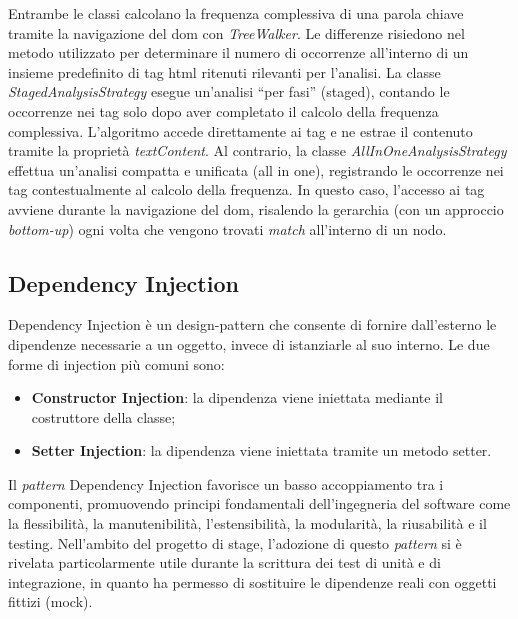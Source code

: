 \vspace{10pt}
\par\noindent Entrambe le classi calcolano la frequenza complessiva di una parola chiave tramite la navigazione del \gls{dom} con \textit{TreeWalker}. Le differenze risiedono nel metodo utilizzato per determinare il numero di occorrenze all’interno di un insieme predefinito di tag \gls{html} ritenuti rilevanti per l’analisi. La classe \textit{StagedAnalysisStrategy} esegue un’analisi “per fasi” (staged), contando le occorrenze nei tag solo dopo aver completato il calcolo della frequenza complessiva. L’algoritmo accede direttamente ai tag e ne estrae il contenuto tramite la proprietà \textit{textContent}. Al contrario, la classe \textit{AllInOneAnalysisStrategy} effettua un’analisi compatta e unificata (all in one), registrando le occorrenze nei tag contestualmente al calcolo della frequenza. In questo caso, l’accesso ai tag avviene durante la navigazione del \gls{dom}, risalendo la gerarchia (con un approccio \textit{bottom-up}) ogni volta che vengono trovati \textit{match} all’interno di un nodo.

\subsection{Dependency Injection}

\par Dependency Injection è un \gls{design-pattern} che consente di fornire dall’esterno le dipendenze necessarie a un oggetto, invece di istanziarle al suo interno. Le due forme di injection più comuni sono:
\begin{itemize}
  \item \textbf{Constructor Injection}: la dipendenza viene iniettata mediante il costruttore della classe;
  \item \textbf{Setter Injection}: la dipendenza viene iniettata tramite un metodo setter.
\end{itemize}

\vspace{5pt}
\par\noindent Il \textit{pattern} Dependency Injection favorisce un basso accoppiamento tra i componenti, promuovendo principi fondamentali dell’ingegneria del software come la flessibilità, la manutenibilità, l’estensibilità, la modularità, la riusabilità e il testing. Nell’ambito del progetto di stage, l’adozione di questo \textit{pattern} si è rivelata particolarmente utile durante la scrittura dei test di unità e di integrazione, in quanto ha permesso di sostituire le dipendenze reali con oggetti fittizi (mock).

